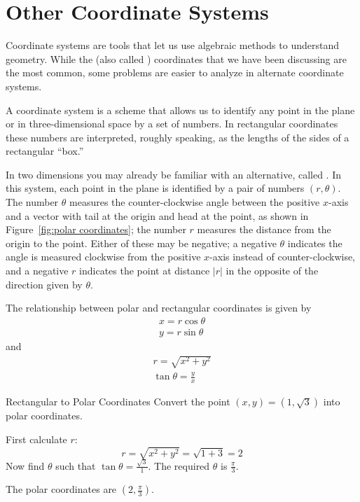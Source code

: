 \section{Other Coordinate Systems}\label{sec:3Dothercoordsystem}

Coordinate systems are tools that let us use algebraic methods to
understand geometry. While the  (also called
) coordinates that we
have been discussing are the most common, some problems are easier to
analyze in alternate coordinate systems.

A coordinate system is a scheme that allows us to identify any point
in the plane or in three-dimensional space by a set of numbers. In
rectangular coordinates these numbers are interpreted, roughly
speaking, as the lengths of the sides of a rectangular ``box.''

In two dimensions you may already be familiar with an alternative,
called . In this system, each
point in the plane is identified by a pair of numbers $(r,\theta)$.
The number $\theta$ measures the counter-clockwise angle between the positive
$x$-axis and a vector with tail at the origin and head at the
point, as shown in Figure~\ref{fig:polar coordinates}; the number
$r$ measures the distance from the origin to the
point. Either of these may be negative; a negative $\theta$ indicates
the angle is measured clockwise from the positive
$x$-axis instead of counter-clockwise, and a negative $r$ indicates
the point at distance $|r|$ in the opposite of the direction given by
$\theta$. 

The relationship between polar and rectangular coordinates is given by
\begin{align*}
x = r \cos \theta \\
y = r \sin \theta 
\end{align*}
and
\begin{align*}
r = \sqrt{x^2 + y^2} \\
\tan \theta = \frac{y}{x} 
\end{align*}

\begin{example}{Rectangular to Polar Coordinates}{}
Convert the point $(x,y) = (1, \sqrt3)$ into polar coordinates.
\end{example}

\begin{solution}
First calculate $r$:
\[
r = \sqrt{x^2 + y^2} = \sqrt{ 1 + 3} = 2
\]
Now find $\theta$ such that $\tan \theta = \frac{\sqrt{3}}{1}$. The required $\theta$ is $\frac{\pi}{3}$. 

The polar coordinates are $(2, \frac{\pi}{3})$. 
\end{solution}

